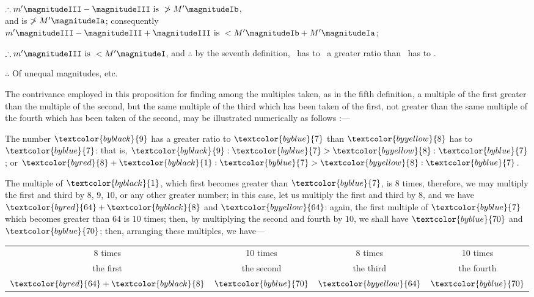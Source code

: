 \documentclass[booklanguage=english]{byrnebook}
\begin{document}
\begin{center}
$\therefore m' \magnitudeIII - \magnitudeIII \mbox{ is } \ngtr M' \magnitudeIb$,\\ %
and \magnitudeIII is $\ngtr M' \magnitudeIa$; consequently\\ %
$m' \magnitudeIII - \magnitudeIII + \magnitudeIII \mbox{ is } < M' \magnitudeIb + M' \magnitudeIa$; %

$\therefore m' \magnitudeIII \mbox{ is } < M' \magnitudeI$, and $\therefore$ by the seventh definition, \magnitudeIII\ has to \magnitudeII\ a greater ratio than \magnitudeIII\ has to \magnitudeI.

$\therefore$ Of unequal magnitudes, etc.
\end{center}

The contrivance employed in this proposition for finding among the multiples taken, as in the fifth definition, a multiple of the first greater than the multiple of the second, but the same multiple of the third which has been taken of the first, not greater than the same multiple of the fourth which has been taken of the second, may be illustrated numerically as follows :—

The number $\textcolor{byblack}{9}$ has a greater ratio to $\textcolor{byblue}{7}$ than $\textcolor{byyellow}{8}$ has to $\textcolor{byblue}{7}$: that is, $\textcolor{byblack}{9} : \textcolor{byblue}{7} > \textcolor{byyellow}{8} : \textcolor{byblue}{7}$; or $\textcolor{byred}{8} + \textcolor{byblack}{1} : \textcolor{byblue}{7} > \textcolor{byyellow}{8} : \textcolor{byblue}{7}$.

The multiple of $\textcolor{byblack}{1}$, which first becomes greater than $\textcolor{byblue}{7}$, is $8$ times, therefore, we may multiply the first and third by $8$, $9$, $10$, or any other greater number; in this case, let us multiply the first and third by $8$, and we have $\textcolor{byred}{64} + \textcolor{byblack}{8}$ and $\textcolor{byyellow}{64}$: again, the first multiple of $\textcolor{byblue}{7}$ which becomes greater than $64$ is $10$ times; then, by multiplying the second and fourth by $10$, we shall have $\textcolor{byblue}{70}$ and $\textcolor{byblue}{70}$; then, arranging these multiples, we have—

\begin{center}
{\renewcommand{\arraystretch}{0.75}
\begin{tabular}{c c c c}
{\footnotesize 8 times} & {\footnotesize 10 times} & {\footnotesize 8 times} & {\footnotesize 10 times} \\
{\footnotesize the first} & {\footnotesize the second} & {\footnotesize the third} & {\footnotesize the fourth} \\
$\textcolor{byred}{64} + \textcolor{byblack}{8}$ & $\textcolor{byblue}{70}$ & $\textcolor{byyellow}{64}$ & $\textcolor{byblue}{70}$ \\
\end{tabular}
}
\end{center}
\end{document}

